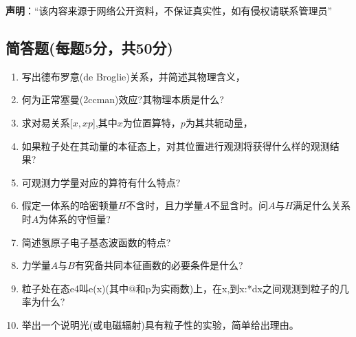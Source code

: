 
\textbf{声明}：“该内容来源于网络公开资料，不保证真实性，如有侵权请联系管理员”

\subsection{简答题(每题5分，共50分)}
\begin{enumerate}
\item 写出德布罗意(de Broglie)关系，并简述其物理含义，
\item 何为正常塞曼(2ccman)效应?其物理本质是什么?
\item 求对易关系[$x,xp$],其中$x$为位置算特，$p$为其共轭动量，
\item 如果粒子处在其动量的本征态上，对其位置进行观测将获得什么样的观测结果?
\item 可观测力学量对应的算符有什么特点?
\item 假定一体系的哈密顿量$H$不含时，且力学量$A$不显含时。问$A$与$H$满足什么关系时$A$为体系的守恒量?
\item 简述氢原子电子基态波函数的特点?
\item 力学量$A$与$B$有究备共同本征画数的必要条件是什么?
\item 粒子处在态e4叫e(x)(其中@和p为实雨数)上，在x,到x:*dx之间观测到粒子的几率为什么?
\item 举出一个说明光(或电磁辐射)具有粒子性的实验，简单给出理由。
\end{enumerate}
